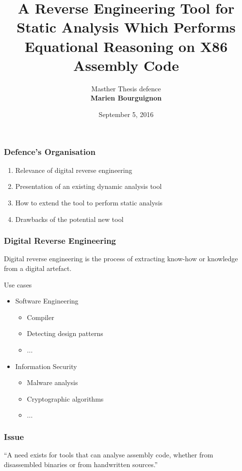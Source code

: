 \documentclass[10pt, xcolor={dvipsnames}]{beamer}
\title{A Reverse Engineering Tool for Static Analysis Which Performs Equational	Reasoning on X86 Assembly Code}
\author{Masther Thesis defence\\\textbf{Marien Bourguignon}}
\institute[UMBC]{Université libre de Bruxelles}
\date{September 5, 2016}
\begin{document}
\maketitle

\begin{frame}
	\frametitle{Defence's Organisation}
	\begin{block}{}
		\begin{enumerate}
			\item Relevance of digital reverse engineering
			\item Presentation of an existing dynamic analysis tool
			\item How to extend the tool to perform static analysis
			\item Drawbacks of the potential new tool
		\end{enumerate}
	\end{block}
\end{frame}

\begin{frame}
	\frametitle{Digital Reverse Engineering}
	\begin{definition}{}
		\alert{Digital reverse engineering} is the process of extracting know-how or knowledge from a digital artefact.
	\end{definition}
	\vfill
	\begin{block}{Use cases}
		\begin{itemize}
			\item Software Engineering
			\begin{itemize}
				\item Compiler
				\item Detecting design patterns
				\item ...
			\end{itemize}
			\item Information Security
			\begin{itemize}
				\item Malware analysis
				\item Cryptographic algorithms 
				\item ...
			\end{itemize}
		\end{itemize}
	\end{block}
\end{frame}

\begin{frame}
	\frametitle{Issue}
	\begin{exampleblock}{}
		{\large “A need exists for tools that can analyse assembly code, whether from disassembled binaries or from handwritten sources.”}
		\vskip5mm
		\hspace*{}
	\end{exampleblock}
\end{frame}
\end{document}
